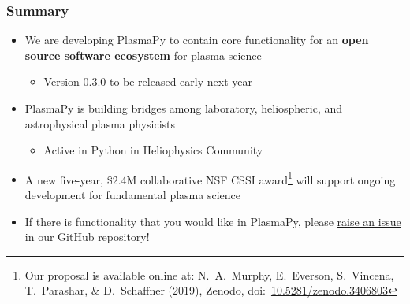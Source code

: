 \documentclass[default,compress]{beamer}
\begin{document}
\begin{frame}[plain]
    \frametitle{Summary}
    \begin{itemize}
    \item We are developing PlasmaPy to contain core functionality for an \textbf{open source software ecosystem} for plasma science
        \begin{itemize}
        \item Version 0.3.0 to be released early next year
        \end{itemize}
    \item PlasmaPy is building bridges among laboratory, heliospheric, and astrophysical plasma physicists
        \begin{itemize}
        \item Active in Python in Heliophysics Community
        \end{itemize}
    \item A new five-year, \$2.4M collaborative NSF CSSI award\footnote{Our proposal is available online at:
    N.\ A.\ Murphy, E.\ Everson, S.\ Vincena, T.\ Parashar, \& D.\ Schaffner (2019), Zenodo, doi:\ 
    \href{https://doi.org/10.5281/zenodo.3406803}{10.5281/zenodo.3406803}} will support ongoing development for fundamental plasma science
    \item If there is functionality that you would like in PlasmaPy, please \href{https://github.com/PlasmaPy/PlasmaPy/issues/new}{raise an issue} in our GitHub repository!
    \end{itemize}
\end{frame}
\end{document}
